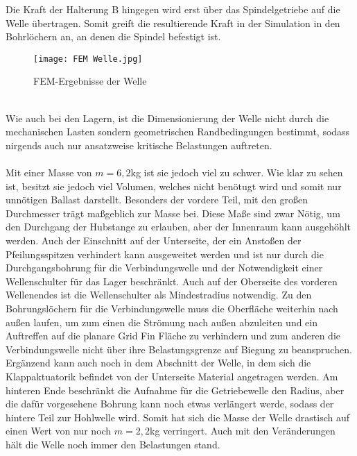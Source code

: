Die Kraft der Halterung B hingegen wird erst über das Spindelgetriebe auf die Welle übertragen. Somit greift die resultierende Kraft in der Simulation in den Bohrlöchern an, an denen die Spindel befestigt ist.
\begin{figure}[h] 
	\centering
	\texttt{[image: FEM Welle.jpg]}
	\caption{FEM-Ergebnisse der Welle}
	\label{abb_Well_FEM}
\end{figure}\\
Wie auch bei den Lagern, ist die Dimensionierung der Welle nicht durch die mechanischen Lasten sondern geometrischen Randbedingungen bestimmt, sodass nirgends auch nur ansatzweise kritische Belastungen auftreten.
\\~\\
Mit einer Masse von $m=6,2$kg ist sie jedoch viel zu schwer. Wie klar zu sehen ist, besitzt sie jedoch viel Volumen, welches nicht benötugt wird und somit nur unnötigen Ballast darstellt. Besonders der vordere Teil, mit den großen Durchmesser trägt maßgeblich zur Masse bei. Diese Maße sind zwar Nötig, um den Durchgang der Hubstange zu erlauben, aber der Innenraum kann ausgehöhlt werden. Auch der Einschnitt auf der Unterseite, der ein Anstoßen der Pfeilungsspitzen verhindert kann ausgeweitet werden und ist nur durch die Durchgangsbohrung für die Verbindungswelle und der Notwendigkeit einer Wellenschulter für das Lager beschränkt. Auch auf der Oberseite des vorderen Wellenendes ist die Wellenschulter als Mindestradius notwendig. Zu den Bohrungslöchern für die Verbindungswelle muss die Oberfläche weiterhin nach außen laufen, um zum einen die Strömung nach außen abzuleiten und ein Auftreffen auf die planare Grid Fin Fläche zu verhindern und zum anderen die Verbindungswelle nicht über ihre Belastungsgrenze auf Biegung zu beanspruchen. Ergänzend kann auch noch in dem Abschnitt der Welle, in dem sich die Klappaktuatorik befindet von der Unterseite Material angetragen werden. Am hinteren Ende beschränkt die Aufnahme für die Getriebewelle den Radius, aber die dafür vorgesehene Bohrung kann noch etwas verlängert werde, sodass der hintere Teil zur Hohlwelle wird. Somit hat sich die Masse der Welle drastisch auf einen Wert von nur noch $m= 2,2$kg verringert. Auch mit den Veränderungen hält die Welle noch immer den Belastungen stand.

